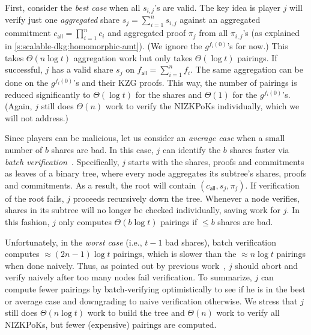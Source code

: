 First, consider the \textit{best case} when all $s_{i,j}$'s are valid.
The key idea is player $j$ will verify just one \textit{aggregated} share $s_j = \sum_{i=1}^n s_{i,j}$ against an aggregated commitment $c_\mathsf{all}=\prod_{i=1}^n c_i$ and aggregated proof $\pi_j$ from all $\pi_{i,j}$'s (as explained in \cref{s:scalable-dkg:homomorphic-amt}).
(We ignore the $g^{f_i(0)}$'s for now.)
This takes $\Theta(n\log{t})$ aggregation work but only takes $\Theta(\log{t})$ pairings.
If successful, $j$ has a valid share $s_j$ on $f_\mathsf{all} = \sum_{i=1}^n f_i$.
The same aggregation can be done on the $g^{f_i(0)}$'s and their KZG proofs.
This way, the number of pairings is reduced significantly to $\Theta(\log{t})$ for the shares and $\Theta(1)$ for the $g^{f_i(0)}$'s.
(Again, $j$ still does $\Theta(n)$ work to verify the NIZKPoKs individually, which we will not address.)

Since players can be malicious, let us consider an \textit{average case} when a small number of $b$ shares are bad.
In this case, $j$ can identify the $b$ shares faster via \textit{batch verification}~\cite{Boldyreva03}.
Specifically, $j$ starts with the shares, proofs and commitments as leaves of a binary tree, where every node aggregates its subtree's shares, proofs and commitments.
As a result, the root will contain $(c_\mathsf{all},s_j,\pi_j)$.
If verification of the root fails, $j$ proceeds recursively down the tree.
Whenever a node verifies, shares in its subtree will no longer be checked individually, saving work for $j$.
In this fashion, $j$ only computes $\Theta(b\log{t})$ pairings if $\le b$ shares are bad.

Unfortunately, in the \textit{worst case} (i.e., $t-1$ bad shares), batch verification computes $\approx(2n-1)\log{t}$ pairings, which is slower than the $\approx n\log{t}$ pairings when done naively.
Thus, as pointed out by previous work~\cite{LM07}, $j$ should abort and verify naively after too many nodes fail verification.
To summarize, $j$ can compute fewer pairings by batch-verifying optimistically to see if he is in the best or average case and downgrading to naive verification otherwise.
We stress that $j$ still does $\Theta(n\log{t})$ work to build the tree and $\Theta(n)$ work to verify all NIZKPoKs, but fewer (expensive) pairings are computed.

